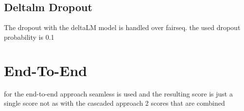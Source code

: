 \section{Deltalm Dropout}
The dropout with the deltaLM model is handled over fairseq. 
the used dropout probability is 0.1 


\chapter{End-To-End}
for the end-to-end approach seamless is used and the resulting score is just a single score not as with the cascaded approach 2 scores that are combined 


